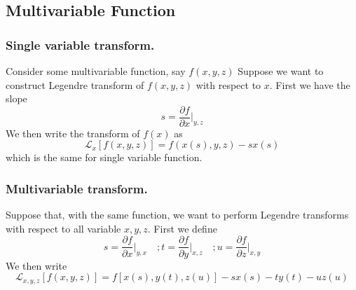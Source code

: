 \documentclass[../../../Main.tex]{subfiles}
\begin{document}
\subsection*{Multivariable Function}
\subsubsection*{Single variable transform.} Consider some multivariable function, say $f(x,y,z)$ Suppose we want to construct Legendre transform of $f(x,y,z)$ with respect to $x$. First we have the slope
\begin{equation*}
    s=\frac{\partial f}{\partial x}\bigg|_{y,z}
\end{equation*}
We then write the transform of $f(x)$ as 
\begin{equation*}
    \mathcal{L}_x[f(x,y,z)] = f(x(s),y,z)-sx(s)
\end{equation*}
which is the same for single variable function.

\subsubsection*{Multivariable transform.} Suppose that, with the same function, we want to perform Legendre transforms with respect to all variable $x,y,z$. First we define
\begin{equation*}
    s=\frac{\partial f}{\partial x}\bigg|_{y,x}\quad ; t=\frac{\partial f}{\partial y}\bigg|_{x,z}\quad ;u=\frac{\partial f}{\partial z}\bigg|_{x,y}
\end{equation*}
We then write
\begin{equation*}
    \mathcal{L}_{x,y,z}[f(x,y,z)] = f[x(s),y(t),z(u)]-sx(s)-ty(t)-uz(u)
\end{equation*}
\end{document}
